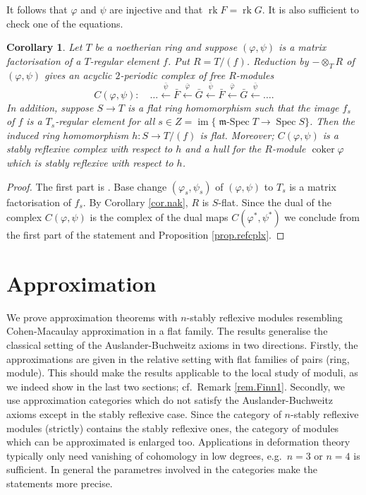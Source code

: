 \documentclass[a4paper,10pt]{amsart}
\theoremstyle{plain}
\newtheorem{cor}[xx]{Corollary}%
\theoremstyle{definition}
\theoremstyle{remark}
\numberwithin{equation}{xx}
\DeclareMathOperator{\coker}{coker}
\DeclareMathOperator{\im}{im}
\DeclareMathOperator{\mSpec}{\fr{m}-Spec}
\DeclareMathOperator{\Rk}{rk}
\DeclareMathOperator{\Spec}{Spec}
\newcommand{\co}{\colon}
\newcommand{\ra}{\rightarrow}
\newcommand{\ot}{{\otimes}}
\renewcommand{\phi}{\varphi}
\newcommand{\fr}[1]{\mathfrak{{#1}}}
\newcommand{\xla}[1]{\xleftarrow{{#1}}}
\begin{document}
It follows that \(\phi\) and \(\psi\) are injective and that \(\Rk F=\Rk G\). It is also sufficient to check one of the equations.
\begin{cor}\label{cor.mf}
Let \(T\) be a noetherian ring and suppose \((\phi,\psi)\) is a matrix factorisation of a \(T\)-regular element \(f\)\textup{.} Put \(R=T/(f)\)\textup{.} Reduction by \(-\ot_{T}R\) of \((\phi,\psi)\) gives an acyclic \(2\)-periodic complex of free \(R\)-modules
\begin{equation*}
C(\phi,\psi)\co \quad\dots \xla{\bar{\psi}}\bar{F}\xla{\bar{\phi}}\bar{G}\xla{\bar{\psi}}\bar{F}\xla{\bar{\phi}}\bar{G}\xla{\bar{\psi}}\dots.
\end{equation*}
In addition\textup{,} suppose \(S\ra T\) is a flat ring homomorphism such that the image \(f_{s}\) of \(f\) is a \(T_{s}\)-regular element for all \(s\in Z=\im\{\mSpec T\ra\Spec S\}\)\textup{.} Then the induced ring homomorphism \(h\co S\ra T/(f)\) is flat\textup{.} Moreover\textup{;} \(C(\phi,\psi)\) is a stably reflexive complex with respect to \(h\) and a hull for the \(R\)-module \(\coker\phi\) which is stably reflexive with respect to \(h\)\textup{.}
\end{cor}
\begin{proof}
The first part is \cite[5.1]{eis:80}. Base change \((\phi_{s},\psi_{s})\) of \((\phi,\psi)\) to \(T_{s}\) is a matrix factorisation of \(f_{s}\). By Corollary \ref{cor.nak}, \(R\) is \(S\)-flat.
Since the dual of the complex \(C(\phi,\psi)\) is the complex of the dual maps \(C(\phi^{*},\psi^{*})\) we conclude from the first part of the statement and Proposition \ref{prop.refcplx}.
\end{proof}
\section{Approximation}\label{sec.approx}
We prove approximation theorems with \(n\)-stably reflexive modules resembling Cohen-Macaulay approximation in a flat family. The results generalise the classical setting of the Auslander-Buchweitz axioms in two directions. Firstly, the approximations are given in the relative setting with flat families of pairs (ring, module). This should make the results applicable to the local study of moduli, as we indeed show in the last two sections; cf.\ Remark \ref{rem.Finn1}. Secondly, we use approximation categories which do not satisfy the Auslander-Buchweitz axioms except in the stably reflexive case. Since the category of \(n\)-stably reflexive modules (strictly) contains the stably reflexive ones, the category of modules which can be approximated is enlarged too. Applications in deformation theory typically only need vanishing of cohomology in low degrees, e.g.\ \(n=3\) or \(n=4\) is sufficient. In general the parametres involved in the categories make the statements more precise.  
\end{document}
